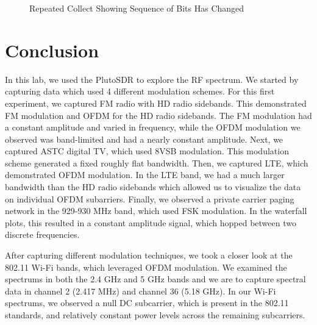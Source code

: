 \documentclass{article}
\begin{document}
\begin{figure}[H]
	\centerline{}
	\caption{Repeated Collect Showing Sequence of Bits Has Changed}
	\label{fig::car_key_spectrogram_repeat}
\end{figure}
 
\section{Conclusion}

In this lab, we used the PlutoSDR to explore the RF spectrum. We started by capturing data which used 4 different modulation schemes. For this first experiment, we captured FM radio with HD radio sidebands. This demonstrated FM modulation and OFDM for the HD radio sidebands. The FM modulation had a constant amplitude and varied in frequency, while the OFDM modulation we observed was band-limited and had a nearly constant amplitude. Next, we captured ASTC digital TV, which used 8VSB modulation. This modulation scheme generated a fixed roughly flat bandwidth. Then, we captured LTE, which demonstrated OFDM modulation. In the LTE band, we had a much larger bandwidth than the HD radio sidebands which allowed us to visualize the data on individual OFDM subarriers. Finally, we observed a private carrier paging network in the 929-930 MHz band, which used FSK modulation. In the waterfall plots, this resulted in a constant amplitude signal, which hopped between two discrete frequencies.

After capturing different modulation techniques, we took a closer look at the 802.11 Wi-Fi bands, which leveraged OFDM modulation. We examined the spectrums in both the 2.4 GHz and 5 GHz bands and we are to capture spectral data in channel 2 (2.417 MHz) and channel 36 (5.18 GHz). In our Wi-Fi spectrums, we observed a null DC subcarrier, which is present in the 802.11 standards, and relatively constant power levels across the remaining subcarriers.


%
%
	
\end{document}
